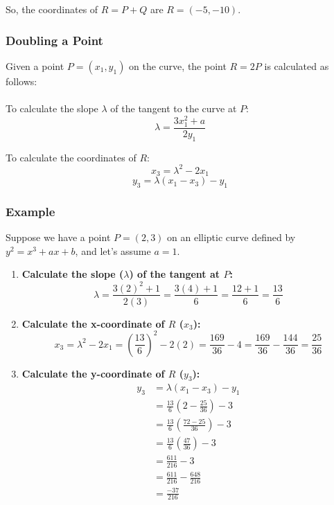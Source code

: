 \documentclass[11pt, letterpaper]{article}
\begin{document}
So, the coordinates of \(R = P + Q\) are \(R = (-5, -10)\).

\subsubsection{Doubling a Point}
Given a point \(P = (x_1, y_1)\) on the curve, the point \(R = 2P\) is calculated as follows: \\ \\

To calculate the slope \(\lambda\) of the tangent to the curve at \(P\):
\begin{equation}
\lambda = \frac{3x_1^2 + a}{2y_1}
\end{equation}

To calculate the coordinates of \(R\):
\begin{equation}
x_3 = \lambda^2 - 2x_1
\end{equation}
\begin{equation}
y_3 = \lambda (x_1 - x_3) - y_1
\end{equation}

\subsubsection*{Example}
Suppose we have a point \(P = (2, 3)\) on an elliptic curve defined by \(y^2 = x^3 + ax + b\), and let's assume \(a = 1\).

\begin{enumerate}
\item \textbf{Calculate the slope (\(\lambda\)) of the tangent at \(P\):}
\begin{equation}
\lambda = \frac{3(2)^2 + 1}{2(3)} = \frac{3(4) + 1}{6} = \frac{12 + 1}{6} = \frac{13}{6}
\end{equation}

\item \textbf{Calculate the x-coordinate of \(R\) (\(x_3\)):}
\begin{equation}
x_3 = \lambda^2 - 2x_1 = \left(\frac{13}{6}\right)^2 - 2(2) = \frac{169}{36} - 4 = \frac{169}{36} - \frac{144}{36} = \frac{25}{36}
\end{equation}

\item \textbf{Calculate the y-coordinate of \(R\) (\(y_3\)):}
\begin{align*}
y_3 &= \lambda (x_1 - x_3) - y_1 \\
&= \frac{13}{6} \left(2 - \frac{25}{36}\right) - 3 \\
&= \frac{13}{6} \left(\frac{72 - 25}{36}\right) - 3 \\
&= \frac{13}{6} \left(\frac{47}{36}\right) - 3 \\
&= \frac{611}{216} - 3 \\
&= \frac{611}{216} - \frac{648}{216} \\
&= \frac{-37}{216}
\end{align*}
    \end{enumerate}
\end{document}
